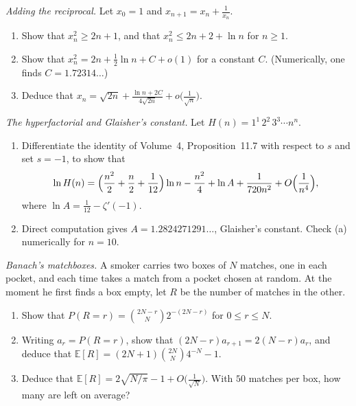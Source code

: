 \begin{exercise}[$\star\star$]\label{pb:xplusinv}
\emph{Adding the reciprocal.} Let $x_0=1$ and $x_{n+1}=x_n+\frac1{x_n}$.
\begin{enumerate}[label=(\alph*)]
\item Show that $x_n^2\ge2n+1$, and that $x_n^2\le2n+2+\ln n$ for $n\ge1$.
\item Show that $x_n^2=2n+\frac12\ln n+C+o(1)$ for a constant $C$. (Numerically, one finds $C=1.72314\ldots$)
\item Deduce that $x_n=\sqrt{2n}+\frac{\ln n+2C}{4\sqrt{2n}}+o\bigl(\frac1{\sqrt n}\bigr)$.
\end{enumerate}
\end{exercise}

\begin{exercise}[$\star\star\star$]\label{pb:hyperfactorial}
\emph{The hyperfactorial and Glaisher's constant.} Let $H(n)=1^1\,2^2\,3^3\cdots n^n$.
\begin{enumerate}[label=(\alph*)]
\item Differentiate the identity of Volume~4, Proposition~11.7 with respect to $s$ and set $s=-1$, to show that
\[
\ln H(n)=\Bigl(\frac{n^2}2+\frac n2+\frac1{12}\Bigr)\ln n-\frac{n^2}4+\ln A+\frac1{720n^2}+O\Bigl(\frac1{n^4}\Bigr),
\]
where $\ln A=\frac1{12}-\zeta'(-1)$.
\item Direct computation gives $A=1.2824271291\ldots$, Glaisher's constant. Check (a) numerically for $n=10$.
\end{enumerate}
\end{exercise}

\begin{exercise}[$\star\star$]\label{pb:banach}
\emph{Banach's matchboxes.} A smoker carries two boxes of $N$ matches, one in each pocket, and each time takes a match from a pocket chosen at random. At the moment he first
finds a box empty, let $R$ be the number of matches in the other.
\begin{enumerate}[label=(\alph*)]
\item Show that $P(R=r)=\binom{2N-r}N2^{-(2N-r)}$ for $0\le r\le N$.
\item Writing $a_r=P(R=r)$, show that $(2N-r)a_{r+1}=2(N-r)a_r$, and deduce that $\mathbb E[R]=(2N+1)\binom{2N}N4^{-N}-1$.
\item Deduce that $\mathbb E[R]=2\sqrt{N/\pi}-1+O\bigl(\frac1{\sqrt N}\bigr)$. With $50$ matches per box, how many are left on average?
\end{enumerate}
\end{exercise}

